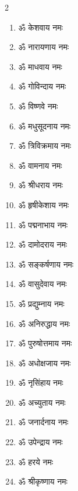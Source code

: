 \begin{multicols}{2}
\begin{enumerate}
\item ॐ केशवाय नमः
\item ॐ नारायणाय नमः
\item ॐ माधवाय नमः
\item ॐ गोविन्दाय नमः
\item ॐ विष्णवे नमः
\item ॐ मधुसूदनाय नमः
\item ॐ त्रिविक्रमाय नमः
\item ॐ वामनाय नमः
\item ॐ श्रीधराय नमः
\item ॐ हृषीकेशाय नमः
\item ॐ पद्मनाभाय नमः
\item ॐ दामोदराय नमः
\item ॐ सङ्कर्षणाय नमः
\item ॐ वासुदेवाय नमः
\item ॐ प्रद्युम्नाय नमः
\item ॐ अनिरुद्धाय नमः
\item ॐ पुरुषोत्तमाय नमः
\item ॐ अधोक्षजाय नमः
\item ॐ नृसिंहाय नमः
\item ॐ अच्युताय नमः
\item ॐ जनार्दनाय नमः
\item ॐ उपेन्द्राय नमः
\item ॐ हरये नमः
\item ॐ श्रीकृष्णाय नमः
\end{enumerate}
\end{multicols}


